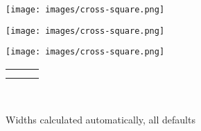 \documentclass[10pt,]{article}
\theoremstyle{plain}
\theoremstyle{definition}
\theoremstyle{definition}
\theoremstyle{definition}
\theoremstyle{definition}
\theoremstyle{definition}
\theoremstyle{definition}
\numberwithin{equation}{section}
\newlength{\panelmax}
\begin{document}
\begin{figure}
\centering
{%
\setlength{\panelmax}{0pt}
\ifdefined\panelboxAimage\else\newsavebox{\panelboxAimage}\fi%
\begin{lrbox}{\panelboxAimage}
\texttt{[image: images/cross-square.png]}
\end{lrbox}
\ifdefined\phAimage\else\newlength{\phAimage}\fi%
\setlength{\phAimage}{\ht\panelboxAimage+\dp\panelboxAimage}
\settototalheight{\phAimage}{\usebox{\panelboxAimage}}
\setlength{\panelmax}{\maxof{\panelmax}{\phAimage}}
\ifdefined\panelboxBimage\else\newsavebox{\panelboxBimage}\fi%
\begin{lrbox}{\panelboxBimage}
\texttt{[image: images/cross-square.png]}
\end{lrbox}
\ifdefined\phBimage\else\newlength{\phBimage}\fi%
\setlength{\phBimage}{\ht\panelboxBimage+\dp\panelboxBimage}
\settototalheight{\phBimage}{\usebox{\panelboxBimage}}
\setlength{\panelmax}{\maxof{\panelmax}{\phBimage}}
\ifdefined\panelboxCimage\else\newsavebox{\panelboxCimage}\fi%
\begin{lrbox}{\panelboxCimage}
\texttt{[image: images/cross-square.png]}
\end{lrbox}
\ifdefined\phCimage\else\newlength{\phCimage}\fi%
\setlength{\phCimage}{\ht\panelboxCimage+\dp\panelboxCimage}
\settototalheight{\phCimage}{\usebox{\panelboxCimage}}
\setlength{\panelmax}{\maxof{\panelmax}{\phCimage}}
\leavevmode%
\setlength{\tabcolsep}{0\linewidth}
\par\medskip\noindent
\begin{tabular}{@{}*{3}{c}@{}}
\begin{minipage}[c][\panelmax][t]{0.333333333333333\linewidth}\usebox{\panelboxAimage}\end{minipage}&
\begin{minipage}[c][\panelmax][t]{0.333333333333333\linewidth}\usebox{\panelboxBimage}\end{minipage}&
\begin{minipage}[c][\panelmax][t]{0.333333333333333\linewidth}\usebox{\panelboxCimage}\end{minipage}\tabularnewline
\parbox[t]{0.333333333333333\linewidth}{\subcaption{\label{figure-55}}
}&
\parbox[t]{0.333333333333333\linewidth}{\subcaption{\label{figure-56}}
}&
\parbox[t]{0.333333333333333\linewidth}{\subcaption{\label{figure-57}}
}\end{tabular}\\
}%
\caption{Widths calculated automatically, all defaults\label{figure-54}}
\end{figure}
\end{document}

